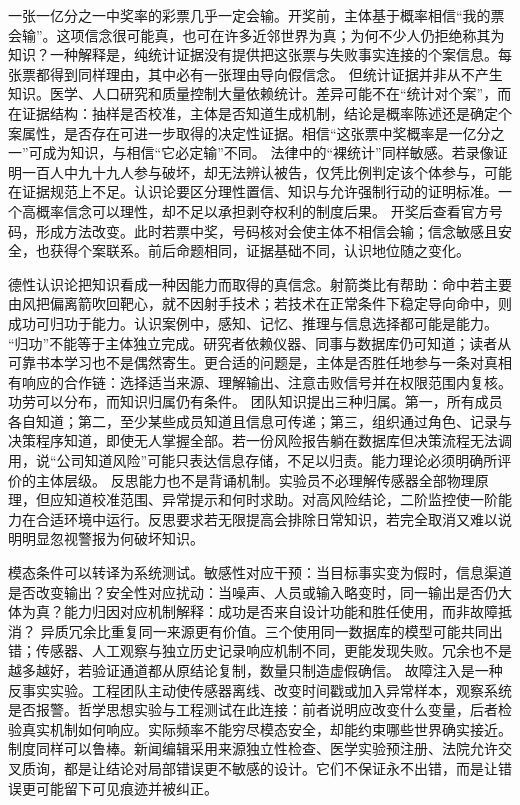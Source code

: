 一张一亿分之一中奖率的彩票几乎一定会输。开奖前，主体基于概率相信“我的票会输”。这项信念很可能真，也可在许多近邻世界为真；为何不少人仍拒绝称其为知识？一种解释是，纯统计证据没有提供把这张票与失败事实连接的个案信息。每张票都得到同样理由，其中必有一张理由导向假信念。 但统计证据并非从不产生知识。医学、人口研究和质量控制大量依赖统计。差异可能不在“统计对个案”，而在证据结构：抽样是否校准，主体是否知道生成机制，结论是概率陈述还是确定个案属性，是否存在可进一步取得的决定性证据。相信“这张票中奖概率是一亿分之一”可成为知识，与相信“它必定输”不同。 法律中的“裸统计”同样敏感。若录像证明一百人中九十九人参与破坏，却无法辨认被告，仅凭比例判定该个体参与，可能在证据规范上不足。认识论要区分理性置信、知识与允许强制行动的证明标准。一个高概率信念可以理性，却不足以承担剥夺权利的制度后果。 开奖后查看官方号码，形成方法改变。此时若票中奖，号码核对会使主体不相信会输；信念敏感且安全，也获得个案联系。前后命题相同，证据基础不同，认识地位随之变化。

德性认识论把知识看成一种因能力而取得的真信念。射箭类比有帮助：命中若主要由风把偏离箭吹回靶心，就不因射手技术；若技术在正常条件下稳定导向命中，则成功可归功于能力。认识案例中，感知、记忆、推理与信息选择都可能是能力。 “归功”不能等于主体独立完成。研究者依赖仪器、同事与数据库仍可知道；读者从可靠书本学习也不是偶然寄生。更合适的问题是，主体是否胜任地参与一条对真相有响应的合作链：选择适当来源、理解输出、注意击败信号并在权限范围内复核。功劳可以分布，而知识归属仍有条件。 团队知识提出三种归属。第一，所有成员各自知道；第二，至少某些成员知道且信息可传递；第三，组织通过角色、记录与决策程序知道，即使无人掌握全部。若一份风险报告躺在数据库但决策流程无法调用，说“公司知道风险”可能只表达信息存储，不足以归责。能力理论必须明确所评价的主体层级。 反思能力也不是背诵机制。实验员不必理解传感器全部物理原理，但应知道校准范围、异常提示和何时求助。对高风险结论，二阶监控使一阶能力在合适环境中运行。反思要求若无限提高会排除日常知识，若完全取消又难以说明明显忽视警报为何破坏知识。

模态条件可以转译为系统测试。敏感性对应干预：当目标事实变为假时，信息渠道是否改变输出？安全性对应扰动：当噪声、人员或输入略变时，同一输出是否仍大体为真？能力归因对应机制解释：成功是否来自设计功能和胜任使用，而非故障抵消？ 异质冗余比重复同一来源更有价值。三个使用同一数据库的模型可能共同出错；传感器、人工观察与独立历史记录响应机制不同，更能发现失败。冗余也不是越多越好，若验证通道都从原结论复制，数量只制造虚假确信。 故障注入是一种反事实实验。工程团队主动使传感器离线、改变时间戳或加入异常样本，观察系统是否报警。哲学思想实验与工程测试在此连接：前者说明应改变什么变量，后者检验真实机制如何响应。实际频率不能穷尽模态安全，却能约束哪些世界确实接近。 制度同样可以鲁棒。新闻编辑采用来源独立性检查、医学实验预注册、法院允许交叉质询，都是让结论对局部错误更不敏感的设计。它们不保证永不出错，而是让错误更可能留下可见痕迹并被纠正。

